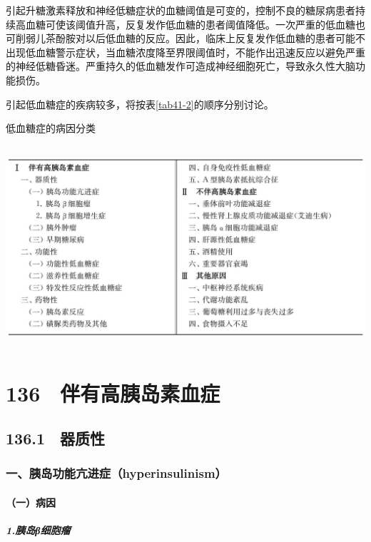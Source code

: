 引起升糖激素释放和神经低糖症状的血糖阈值是可变的，控制不良的糖尿病患者持续高血糖可使该阈值升高，反复发作低血糖的患者阈值降低。一次严重的低血糖也可削弱儿茶酚胺对以后低血糖的反应。因此，临床上反复发作低血糖的患者可能不出现低血糖警示症状，当血糖浓度降至界限阈值时，不能作出迅速反应以避免严重的神经低糖昏迷。严重持久的低血糖发作可造成神经细胞死亡，导致永久性大脑功能损伤。

引起低血糖症的疾病较多，将按表\ref{tab41-2}的顺序分别讨论。

\begin{table}[htbp]
\centering
\caption{低血糖症的病因分类}
\label{tab41-2}
\includegraphics[width=5.90625in,height=2.95833in]{./images/Image00251.jpg}
\end{table}

\protect\hypertarget{text00318.html}{}{}

\section{136　伴有高胰岛素血症}

\subsection{136.1　器质性}

\subsubsection{一、胰岛功能亢进症（hyperinsulinism）}

\paragraph{（一）病因}

\subparagraph{1.胰岛β细胞瘤}

